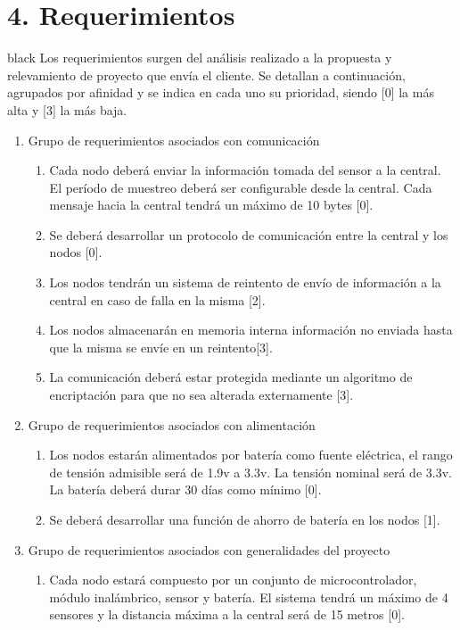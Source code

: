 \documentclass[11pt]{charter}
\begin{document}
\section{4. Requerimientos}
\label{sec:requerimientos}

\begin{consigna}{black}
Los requerimientos surgen del análisis realizado a la propuesta y relevamiento de proyecto que envía el cliente. Se detallan a continuación, agrupados por afinidad y se indica en cada uno su prioridad, siendo [0] la más alta y [3] la más baja.

\begin{enumerate}
\item Grupo de requerimientos asociados con comunicación
	\begin{enumerate}
	\item Cada nodo deberá enviar la información tomada del sensor a la central. El período de muestreo deberá ser configurable desde la central. Cada mensaje hacia la central tendrá un máximo de 10 bytes [0].
	\item Se deberá desarrollar un protocolo de comunicación entre la central y los nodos [0].
	\item Los nodos tendrán un sistema de reintento de envío de información a la central en caso de falla en la misma [2].
	\item Los nodos almacenarán en memoria interna información no enviada hasta que la misma se envíe en un reintento[3].
	\item La comunicación deberá estar protegida mediante un algoritmo de encriptación para que no sea alterada externamente [3].
	\end{enumerate}
\item Grupo de requerimientos asociados con alimentación
	\begin{enumerate}
	\item Los nodos estarán alimentados por batería como fuente eléctrica, el rango de tensión admisible será de 1.9v a 3.3v. La tensión nominal será de 3.3v. La batería deberá durar 30 días como mínimo [0].
	\item Se deberá desarrollar una función de ahorro de batería en los nodos [1].
	\end{enumerate}
\item Grupo de requerimientos asociados con generalidades del proyecto
	\begin{enumerate}
	\item Cada nodo estará compuesto por un conjunto de microcontrolador, módulo inalámbrico, sensor y batería. El sistema tendrá un máximo de 4 sensores y la distancia máxima a la central será de 15 metros [0].

\end{enumerate}
\end{enumerate}
\end{consigna}
\end{document}
